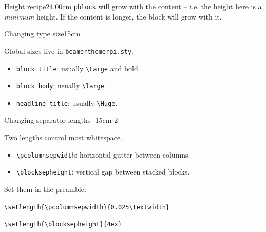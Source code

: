 \documentclass[final]{beamer}
\newlength{\colwidth}
\newlength{\twocolwidth}
\begin{document}
\begin{pframe}
\begin{pcolumn}{\twocolwidth}
\begin{pblock}{Height recipe}{24.00cm}
      \texttt{pblock} will grow with the content -- i.e. the height here is a \textit{minimum} height. If the content is longer, the block will grow with it.

		\end{pblock}

		\begin{prow}
			\begin{pcolumn}{\colwidth}

				\begin{pblock}{Changing type size}{15cm}

					Global sizes live in \texttt{beamerthemerpi.sty}.

					\begin{itemize}
						\item \texttt{block title}: usually \texttt{\textbackslash Large} and bold.
						\item \texttt{block body}: usually \texttt{\textbackslash large}.
						\item \texttt{headline title}: usually \texttt{\textbackslash Huge}.
					\end{itemize}

				\end{pblock}


				\begin{pblock}{Changing separator lengths}{
						\textheight-24cm-15cm-2\blocksepheight
					}

					Two lengths control most whitespace.

					\begin{itemize}
						\item \texttt{\textbackslash pcolumnsepwidth}: horizontal gutter between columns.
						\item \texttt{\textbackslash blocksepheight}: vertical gap between stacked blocks.
					\end{itemize}

					Set them in the preamble:

					\texttt{\textbackslash setlength\{\textbackslash pcolumnsepwidth\}\{0.025\textbackslash textwidth\}}\par
					\texttt{\textbackslash setlength\{\textbackslash blocksepheight\}\{4ex\}}

				\end{pblock}


			\end{pcolumn}

			\begin{pcolumn}{\colwidth}


\end{pcolumn}
\end{prow}
\end{pcolumn}
\end{pframe}
\end{document}
